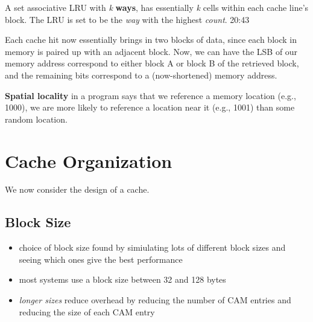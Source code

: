 
\begin{definition}
  A set associative LRU with \emph{k} \textbf{ways}, has essentially \emph{k} cells within each cache line's block. The LRU is set to be the \emph{way} with the highest \emph{count}. 20:43
\end{definition}

Each cache hit now essentially brings in two blocks of data, since each block in memory is paired up with an adjacent block. Now, we can have the LSB of our memory address correspond to either block A or block B of the retrieved block, and the remaining bits correspond to a (now-shortened) memory address.

\begin{definition}
  \textbf{Spatial locality} in a program says that we reference a memory location (e.g., 1000), we are more likely to reference a location near it (e.g., 1001) than some random location.
\end{definition}

\section{Cache Organization}
We now consider the design of a cache.

\subsection{Block Size}
\begin{itemize}
  \item choice of block size found by simiulating lots of different block sizes and seeing which ones give the best performance
  \item most systems use a block size between 32 and 128 bytes
  \item \emph{longer sizes} reduce overhead by reducing the number of CAM entries and reducing the size of each CAM entry
\end{itemize}

